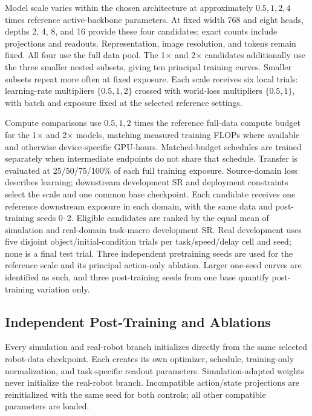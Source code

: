 Model scale varies within the chosen architecture at approximately
$0.5,1,2,4$ times reference active-backbone parameters. At fixed width 768
and eight heads, depths 2, 4, 8, and 16 provide these four candidates;
exact counts include projections and readouts. Representation, image
resolution, and tokens remain fixed. All four use the full data pool.
The 1$\times$ and 2$\times$ candidates additionally use the three smaller
nested subsets, giving ten principal training curves. Smaller subsets
repeat more often at fixed exposure. Each scale receives six local trials: learning-rate multipliers
$\{0.5,1,2\}$ crossed with world-loss multipliers $\{0.5,1\}$, with batch
and exposure fixed at the selected reference settings.

Compute comparisons use $0.5,1,2$ times the reference full-data compute
budget for the 1$\times$ and 2$\times$ models, matching measured training
FLOPs where available and otherwise device-specific GPU-hours.
Matched-budget schedules are trained separately when intermediate endpoints
do not share that schedule. Transfer is evaluated at 25/50/75/100\% of
each full training exposure. Source-domain loss describes learning;
downstream development SR and deployment constraints select the scale
and one common base checkpoint. Each candidate receives one reference
downstream exposure in each domain, with the same data and post-training
seeds 0--2. Eligible candidates are ranked by the equal mean of simulation
and real-domain task-macro development SR. Real development uses five
disjoint object/initial-condition trials per task/speed/delay cell and seed;
none is a final test trial. Three independent pretraining seeds are
used for the reference scale and its principal action-only ablation.
Larger one-seed curves are identified as such, and three post-training
seeds from one base quantify post-training variation only.



\subsection{Independent Post-Training and Ablations}
Every simulation and real-robot branch initializes directly from the same
selected robot-data checkpoint. Each creates its own optimizer, schedule,
training-only normalization, and task-specific readout parameters.
Simulation-adapted weights never initialize the real-robot branch.
Incompatible action/state projections are reinitialized with the same
seed for both controls; all other compatible parameters are loaded.

